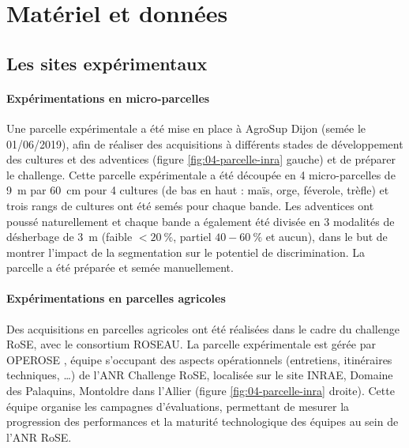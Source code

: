 \documentclass[../thesis.tex]{subfiles}
\begin{document}
    \chapter{Matériel et données}
    \label{chap:mat-and-data}
    
    \section{Les sites expérimentaux}
    
    \subsubsection{Expérimentations en micro-parcelles}
    \label{sec:premiere-xp}
    
    Une parcelle expérimentale a été mise en place à AgroSup Dijon (semée le 01/06/2019), afin de réaliser des acquisitions à différents stades de développement des cultures et des adventices (figure \ref{fig:04-parcelle-inra} gauche) et de préparer le challenge. Cette parcelle expérimentale a été découpée en 4 micro-parcelles de \SI{9}{m} par \SI{60}{cm} pour 4 cultures (de bas en haut : maïs, orge, féverole, trèfle) et trois rangs de cultures ont été semés pour chaque bande. Les adventices ont poussé naturellement et chaque bande a également été divisée en 3 modalités de désherbage de \SI{3}{m} (faible $<\SI{20}{\percent}$, partiel $40-\SI{60}{\percent}$ et aucun), dans le but de montrer l'impact de la segmentation sur le potentiel de discrimination. La parcelle a été préparée et semée manuellement.
    
    \subsubsection{Expérimentations en parcelles agricoles}
    \label{sec:grande-xp}
    
    Des acquisitions en parcelles agricoles ont été réalisées dans le cadre du challenge RoSE, avec le consortium ROSEAU. La parcelle expérimentale est gérée par OPEROSE \cite{ChallengeRoSE}, équipe s'occupant des aspects opérationnels (entretiens, itinéraires techniques, \dots) de l'ANR Challenge RoSE, localisée sur le site INRAE, Domaine des Palaquins, Montoldre dans l'Allier (figure \ref{fig:04-parcelle-inra} droite). Cette équipe organise les campagnes d'évaluations, permettant de mesurer la progression des performances et la maturité technologique des équipes au sein de l'ANR RoSE. 
    
\end{document}
